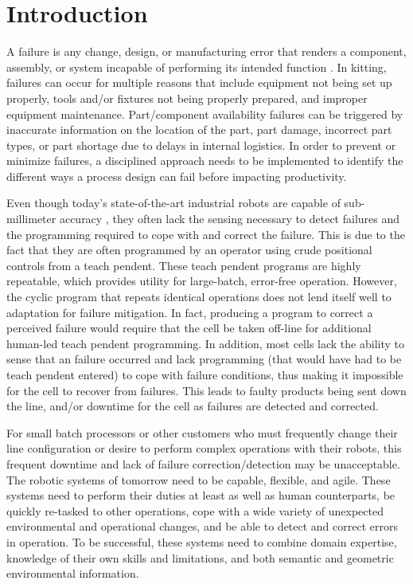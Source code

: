 \section{Introduction}
A failure is any change, design, or manufacturing error that renders a component, assembly, or system incapable of performing its intended function \cite{Collins93}. In kitting, failures can occur for multiple reasons that include equipment not being set up properly, tools and/or fixtures not being properly prepared, and improper equipment maintenance. Part/component availability failures can be triggered by inaccurate information on the location of the part, part damage, incorrect part types, or part shortage due to delays in internal logistics. In order to prevent or minimize failures, a disciplined approach needs to be implemented to identify the different ways a process design can fail before impacting productivity.

Even though today's state-of-the-art industrial robots are capable of sub-millimeter accuracy \cite{RobotAccuracy}, they often lack the sensing
necessary to detect failures and the programming required to cope with and correct the failure. This is due to the fact that they are often programmed
by an operator using crude positional controls from a teach pendent. These teach pendent programs are highly repeatable, which provides 
utility for large-batch, error-free operation. However, the cyclic program that repeats identical operations does not lend itself well to adaptation for 
failure mitigation. In fact, producing a program to correct a perceived failure would require that the cell be taken off-line
for additional human-led teach pendent programming. In addition, 
most cells lack the ability to sense that an failure occurred and  lack programming (that would have had to be teach pendent entered) to cope
with failure conditions, thus making it impossible for the cell to recover from failures.
This leads to faulty products being sent down the line, and/or downtime for the cell as failures are detected and corrected.

For small batch processors or other customers who must frequently change their line configuration or desire to perform complex operations
with their robots, this frequent downtime and lack of failure correction/detection may be unacceptable. The robotic systems of tomorrow need to be capable, flexible, and agile.  
These systems need to perform their duties at least  as well as human counterparts, be quickly re-tasked to other operations, cope with a wide 
variety of unexpected environmental and operational changes, and be able to detect and correct errors in operation. 
To be successful, these systems need to combine domain expertise, knowledge of their own skills and limitations, and both semantic and geometric 
environmental information.

